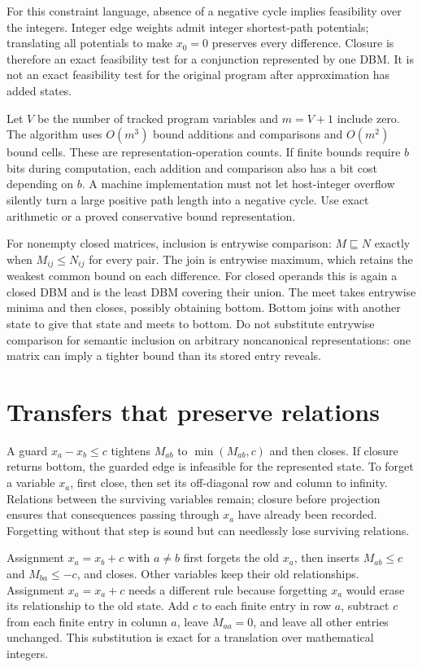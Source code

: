 For this constraint language, absence of a negative cycle implies feasibility over the integers.
Integer edge weights admit integer shortest-path potentials; translating all potentials to make $x_0=0$ preserves every difference.
Closure is therefore an exact feasibility test for a conjunction represented by one DBM.
It is not an exact feasibility test for the original program after approximation has added states.

Let $V$ be the number of tracked program variables and $m=V+1$ include zero.
The algorithm uses $O(m^3)$ bound additions and comparisons and $O(m^2)$ bound cells.
These are representation-operation counts.
If finite bounds require $b$ bits during computation, each addition and comparison also has a bit cost depending on $b$.
A machine implementation must not let host-integer overflow silently turn a large positive path length into a negative cycle.
Use exact arithmetic or a proved conservative bound representation.

For nonempty closed matrices, inclusion is entrywise comparison: $M\sqsubseteq N$ exactly when $M_{ij}\leq N_{ij}$ for every pair.
The join is entrywise maximum, which retains the weakest common bound on each difference.
For closed operands this is again a closed DBM and is the least DBM covering their union.
The meet takes entrywise minima and then closes, possibly obtaining bottom.
Bottom joins with another state to give that state and meets to bottom.
Do not substitute entrywise comparison for semantic inclusion on arbitrary noncanonical representations: one matrix can imply a tighter bound than its stored entry reveals.

\section{Transfers that preserve relations}
\label{sec:ch43-transfers}

A guard $x_a-x_b\leq c$ tightens $M_{ab}$ to $\min(M_{ab},c)$ and then closes.
If closure returns bottom, the guarded edge is infeasible for the represented state.
To forget a variable $x_a$, first close, then set its off-diagonal row and column to infinity.
Relations between the surviving variables remain; closure before projection ensures that consequences passing through $x_a$ have already been recorded.
Forgetting without that step is sound but can needlessly lose surviving relations.

Assignment $x_a=x_b+c$ with $a\neq b$ first forgets the old $x_a$, then inserts $M_{ab}\leq c$ and $M_{ba}\leq-c$, and closes.
Other variables keep their old relationships.
Assignment $x_a=x_a+c$ needs a different rule because forgetting $x_a$ would erase its relationship to the old state.
Add $c$ to each finite entry in row $a$, subtract $c$ from each finite entry in column $a$, leave $M_{aa}=0$, and leave all other entries unchanged.
This substitution is exact for a translation over mathematical integers.

